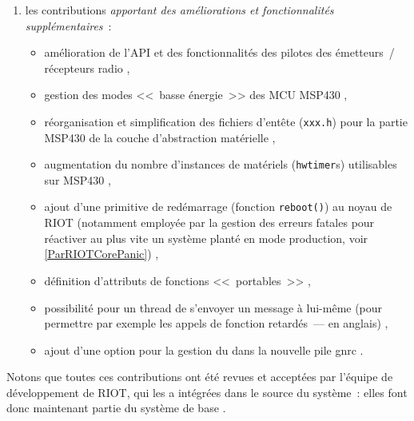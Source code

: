 \begin{enumerate}
\item les contributions \emph{apportant des améliorations et fonctionnalités
supplémentaires}~:
\begin{itemize}
\item amélioration de l'API et des fonctionnalités des pilotes des
émetteurs~/ récepteurs radio \cite{PRriotEnh12} \cite{PRriotEnh10}
\cite{PRriotEnh11} \cite{PRriotEnh7} \cite{PRriotEnh6},
\item gestion des modes <<~basse énergie~>> des MCU MSP430
\cite{PRriotEnh2},
\item réorganisation et simplification des fichiers d'entête
(\texttt{xxx.h}) pour la partie MSP430 de la couche d'abstraction
matérielle \cite{PRriotEnh1},
\item augmentation du nombre d'instances de  matériels
(\texttt{hwtimer}s) utilisables sur MSP430 \cite{PRriotEnh9},
\item ajout d'une primitive de redémarrage (fonction \texttt{reboot()})
au noyau de RIOT (notamment employée par la gestion des erreurs fatales
pour réactiver au plus vite un système planté en mode production, voir
\vref{ParRIOTCorePanic}) \cite{PRriotEnh5} \cite{PRriotEnh3},
\item définition d'attributs de fonctions <<~portables~>>
\cite{PRriotEnh4},
\item possibilité pour un thread de s'envoyer un message à lui-même
(pour permettre par exemple les appels de fonction retardés~---
 en anglais) \cite{PRriotEnh8},
\item ajout d'une option pour la gestion du 
dans la nouvelle pile gnrc \cite{PRriotEnh13}.
\end{itemize}

\end{enumerate}

\medskip

Notons que toutes ces contributions ont été revues et acceptées par
l'équipe de développement de RIOT, qui les a intégrées dans le source
 du système~: elles font donc maintenant partie du
système de base \footnotemark[3].


